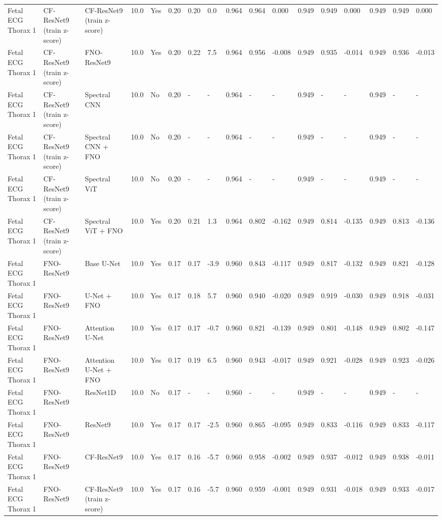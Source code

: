 \begin{longtable}{lllllllllllllllll}
Fetal ECG Thorax 1 & CF-ResNet9 (train z-score) & CF-ResNet9 (train z-score) & 10.0 & Yes & 0.20 & 0.20 & 0.0 & 0.964 & 0.964 & 0.000 & 0.949 & 0.949 & 0.000 & 0.949 & 0.949 & 0.000 \\
Fetal ECG Thorax 1 & CF-ResNet9 (train z-score) & FNO-ResNet9 & 10.0 & Yes & 0.20 & 0.22 & 7.5 & 0.964 & 0.956 & -0.008 & 0.949 & 0.935 & -0.014 & 0.949 & 0.936 & -0.013 \\
Fetal ECG Thorax 1 & CF-ResNet9 (train z-score) & Spectral CNN & 10.0 & No & 0.20 & - & - & 0.964 & - & - & 0.949 & - & - & 0.949 & - & - \\
Fetal ECG Thorax 1 & CF-ResNet9 (train z-score) & Spectral CNN + FNO & 10.0 & No & 0.20 & - & - & 0.964 & - & - & 0.949 & - & - & 0.949 & - & - \\
Fetal ECG Thorax 1 & CF-ResNet9 (train z-score) & Spectral ViT & 10.0 & No & 0.20 & - & - & 0.964 & - & - & 0.949 & - & - & 0.949 & - & - \\
Fetal ECG Thorax 1 & CF-ResNet9 (train z-score) & Spectral ViT + FNO & 10.0 & Yes & 0.20 & 0.21 & 1.3 & 0.964 & 0.802 & -0.162 & 0.949 & 0.814 & -0.135 & 0.949 & 0.813 & -0.136 \\
Fetal ECG Thorax 1 & FNO-ResNet9 & Base U-Net & 10.0 & Yes & 0.17 & 0.17 & -3.9 & 0.960 & 0.843 & -0.117 & 0.949 & 0.817 & -0.132 & 0.949 & 0.821 & -0.128 \\
Fetal ECG Thorax 1 & FNO-ResNet9 & U-Net + FNO & 10.0 & Yes & 0.17 & 0.18 & 5.7 & 0.960 & 0.940 & -0.020 & 0.949 & 0.919 & -0.030 & 0.949 & 0.918 & -0.031 \\
Fetal ECG Thorax 1 & FNO-ResNet9 & Attention U-Net & 10.0 & Yes & 0.17 & 0.17 & -0.7 & 0.960 & 0.821 & -0.139 & 0.949 & 0.801 & -0.148 & 0.949 & 0.802 & -0.147 \\
Fetal ECG Thorax 1 & FNO-ResNet9 & Attention U-Net + FNO & 10.0 & Yes & 0.17 & 0.19 & 6.5 & 0.960 & 0.943 & -0.017 & 0.949 & 0.921 & -0.028 & 0.949 & 0.923 & -0.026 \\
Fetal ECG Thorax 1 & FNO-ResNet9 & ResNet1D & 10.0 & No & 0.17 & - & - & 0.960 & - & - & 0.949 & - & - & 0.949 & - & - \\
Fetal ECG Thorax 1 & FNO-ResNet9 & ResNet9 & 10.0 & Yes & 0.17 & 0.17 & -2.5 & 0.960 & 0.865 & -0.095 & 0.949 & 0.833 & -0.116 & 0.949 & 0.833 & -0.117 \\
Fetal ECG Thorax 1 & FNO-ResNet9 & CF-ResNet9 & 10.0 & Yes & 0.17 & 0.16 & -5.7 & 0.960 & 0.958 & -0.002 & 0.949 & 0.937 & -0.012 & 0.949 & 0.938 & -0.011 \\
Fetal ECG Thorax 1 & FNO-ResNet9 & CF-ResNet9 (train z-score) & 10.0 & Yes & 0.17 & 0.16 & -5.7 & 0.960 & 0.959 & -0.001 & 0.949 & 0.931 & -0.018 & 0.949 & 0.933 & -0.017 \\

\end{longtable}
